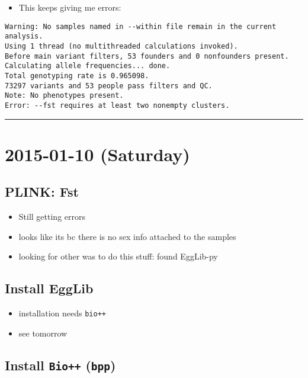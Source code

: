 \documentclass[letterpaper]{scrartcl}
\begin{document}
\begin{itemize}
\itemsep1pt\parskip0pt
\item
  This keeps giving me errors:
\end{itemize}

\begin{verbatim}
Warning: No samples named in --within file remain in the current analysis.
Using 1 thread (no multithreaded calculations invoked).
Before main variant filters, 53 founders and 0 nonfounders present.
Calculating allele frequencies... done.
Total genotyping rate is 0.965098.
73297 variants and 53 people pass filters and QC.
Note: No phenotypes present.
Error: --fst requires at least two nonempty clusters.
\end{verbatim}

\begin{center}\rule{0.5\linewidth}{\linethickness}\end{center}

\section{2015-01-10 (Saturday)}\label{saturday-1}

\subsection{PLINK: Fst}\label{plink-fst-1}

\begin{itemize}
\itemsep1pt\parskip0pt
\item
  Still getting errors
\item
  looks like its bc there is no sex info attached to the samples
\item
  looking for other was to do this stuff: found EggLib-py
\end{itemize}

\subsection{Install EggLib}\label{install-egglib}

\begin{itemize}
\itemsep1pt\parskip0pt
\item
  installation needs \texttt{bio++}
\item
  see tomorrow
\end{itemize}

\subsection{Install \texttt{Bio++}
(\texttt{bpp})}\label{install-bio-bpp}
\end{document}
